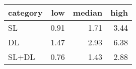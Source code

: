 \begin{tabular}{lrrr}
\hline
 category   &   low &   median &   high \\
\hline
 SL         &  0.91 &     1.71 &   3.44 \\
 DL         &  1.47 &     2.93 &   6.38 \\
 SL+DL      &  0.76 &     1.43 &   2.88 \\
\hline
\end{tabular}